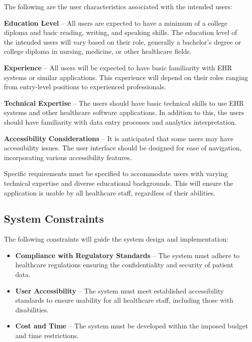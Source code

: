 \documentclass[12pt]{article}
\begin{document}
The following are the user characteristics associated with the intended users:

\textbf{Education Level} -- All users are expected to have a minimum of a college diploma and basic reading, writing, and speaking skills. The education level of the intended users will vary based on their role, generally a bachelor’s degree or college diploma in nursing, medicine, or other healthcare fields. 

\textbf{Experience} -- All users will be expected to have basic familiarity with EHR systems or similar applications. This experience will depend on their roles ranging from entry-level positions to experienced professionals. 

\textbf{Technical Expertise} -- The users should have basic technical skills to use EHR systems and other healthcare software applications. In addition to this, the users should have familiarity with data entry processes and analytics interpretation.

\textbf{Accessibility Considerations} -- It is anticipated that some users may have accessibility issues. The user interface should be designed for ease of navigation, incorporating various accessibility features.

Specific requirements must be specified to accommodate users with varying technical expertise and diverse educational backgrounds. This will ensure the application is usable by all healthcare staff, regardless of their abilities.


\subsection{System Constraints}

The following constraints will guide the system design and implementation:

\begin{itemize} 

  \item \textbf{Compliance with Regulatory Standards} -- The system must adhere to healthcare regulations ensuring the confidentiality and security of patient data.

  \item \textbf{User Accessibility} -- The system must meet established accessibility standards to ensure usability for all healthcare staff, including those with disabilities.

  \item \textbf{Cost and Time} -- The system must be developed within the imposed budget and time restrictions.

\end{itemize}
\end{document}
